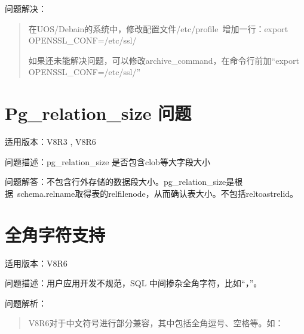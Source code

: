 \documentclass[a4,10pt,oneside,english]{sphinxmanual}
\let\sphinxpxdimen\pdfpxdimen\else\newdimen\sphinxpxdimen
\begin{document}
\begin{sphinxVerbatim}[commandchars=\\\{\}]
     
          
\end{sphinxVerbatim}

问题解决：
\begin{quote}

在UOS/Debain的系统中，修改配置文件/etc/profile 增加一行：export OPENSSL\_CONF=/etc/ssl/

如果还未能解决问题，可以修改archive\_command，在命令行前加“export OPENSSL\_CONF=/etc/ssl/”
\end{quote}


\section{Pg\_relation\_size 问题}
\label{\detokenize{sql:pg-relation-size}}
适用版本：V8R3 , V8R6

问题描述：pg\_relation\_size 是否包含clob等大字段大小

问题解答：不包含行外存储的数据段大小。pg\_relation\_size是根据 schema.relname取得表的relfilenode，从而确认表大小。不包括reltoastrelid。


\section{全角字符支持}
\label{\detokenize{sql:id20}}
适用版本：V8R6

问题描述：用户应用开发不规范，SQL 中间掺杂全角字符，比如“，”。

问题解析：
\begin{quote}

V8R6对于中文符号进行部分兼容，其中包括全角逗号、空格等。如：

\begin{figure}[H]
\centering

\noindent\sphinxincludegraphics[width=243\sphinxpxdimen,height=56\sphinxpxdimen]{{FAQ13964}.png}
\end{figure}
\end{quote}
\end{document}
